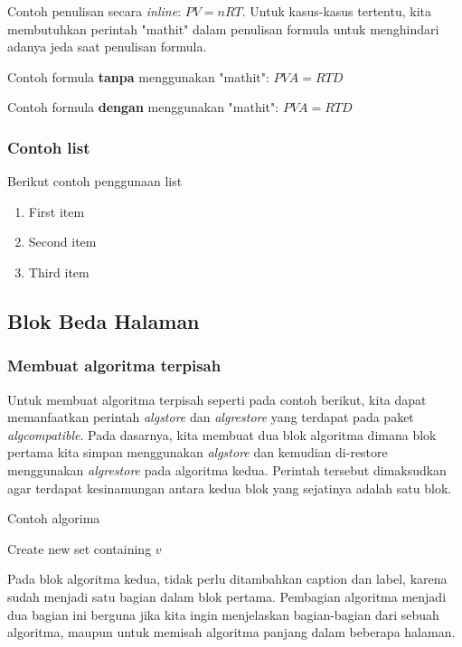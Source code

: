 Contoh penulisan secara \textit{inline}: $\mathit{PV = nRT}$. Untuk kasus-kasus tertentu, kita membutuhkan perintah "mathit" dalam penulisan formula untuk menghindari adanya jeda saat penulisan formula.

Contoh formula \textbf{tanpa} menggunakan "mathit": $PVA = RTD$

Contoh formula \textbf{dengan} menggunakan "mathit": $\mathit{PVA = RTD}$



\subsubsection{Contoh list}
Berikut contoh penggunaan list
\begin{enumerate}
	\item First item
	\item Second item
	\item Third item
\end{enumerate}

\subsection{Blok Beda Halaman}

\subsubsection{Membuat algoritma terpisah}

Untuk membuat algoritma terpisah seperti pada contoh berikut, kita dapat memanfaatkan perintah \textit{algstore} dan \textit{algrestore} yang terdapat pada paket \textit{algcompatible}. Pada dasarnya, kita membuat dua blok algoritma dimana blok pertama kita simpan menggunakan \textit{algstore} dan kemudian di-restore menggunakan \textit{algrestore} pada algoritma kedua. Perintah tersebut dimaksudkan agar terdapat kesinamungan antara kedua blok yang sejatinya adalah satu blok. 

\begin{algorithm}                     
	\caption{Contoh algorima}          
	\label{findme}                          
	\begin{algorithmic} [1]                   
		\State Create new set containing $v$
		\EndProcedure
	\end{algorithmic}
\end{algorithm}

Pada blok algoritma kedua, tidak perlu ditambahkan caption dan label, karena sudah menjadi satu bagian dalam blok pertama. Pembagian algoritma menjadi dua bagian ini berguna jika kita ingin menjelaskan bagian-bagian dari sebuah algoritma, maupun untuk memisah algoritma panjang dalam beberapa halaman.

